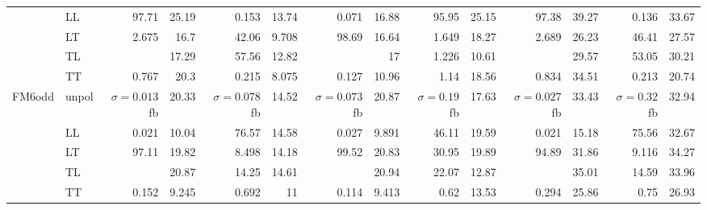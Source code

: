 \begin{table}[h]
{\begin{tabular}{llrrrrrrrrrrrr}
 & LL & \num{97.71} & \num{25.19} & \num{0.153} & \num{13.74} & \num{0.071} & \num{16.88} & \num{95.95} & \num{25.15} & \num{97.38} & \num{39.27} & \num{0.136} & \num{33.67} \\
 & LT & \num{2.675} & \num{16.7} & \num{42.06} & \num{9.708} & \num{98.69} & \num{16.64} & \num{1.649} & \num{18.27} & \num{2.689} & \num{26.23} & \num{46.41} & \num{27.57} \\
 & TL &  & \num{17.29} & \num{57.56} & \num{12.82} &  & \num{17} & \num{1.226} & \num{10.61} &  & \num{29.57} & \num{53.05} & \num{30.21} \\
 & TT & \num{0.767} & \num{20.3} & \num{0.215} & \num{8.075} & \num{0.127} & \num{10.96} & \num{1.14} & \num{18.56} & \num{0.834} & \num{34.51} & \num{0.213} & \num{20.74} \\
\midrule
\multirow{5}{*}{FM6odd}
 & unpol & $\sigma = \num{0.013}$ fb & \num{20.33} & $\sigma = \num{0.078}$ fb & \num{14.52} & $\sigma = \num{0.073}$ fb & \num{20.87} & $\sigma = \num{0.19}$ fb & \num{17.63} & $\sigma = \num{0.027}$ fb & \num{33.43} & $\sigma = \num{0.32}$ fb & \num{32.94} \\
 & LL & \num{0.021} & \num{10.04} & \num{76.57} & \num{14.58} & \num{0.027} & \num{9.891} & \num{46.11} & \num{19.59} & \num{0.021} & \num{15.18} & \num{75.56} & \num{32.67} \\
 & LT & \num{97.11} & \num{19.82} & \num{8.498} & \num{14.18} & \num{99.52} & \num{20.83} & \num{30.95} & \num{19.89} & \num{94.89} & \num{31.86} & \num{9.116} & \num{34.27} \\
 & TL &  & \num{20.87} & \num{14.25} & \num{14.61} &  & \num{20.94} & \num{22.07} & \num{12.87} &  & \num{35.01} & \num{14.59} & \num{33.96} \\
 & TT & \num{0.152} & \num{9.245} & \num{0.692} & \num{11} & \num{0.114} & \num{9.413} & \num{0.62} & \num{13.53} & \num{0.294} & \num{25.86} & \num{0.75} & \num{26.93} \\
\bottomrule
\end{tabular}
}%
\end{table}
\newpage
